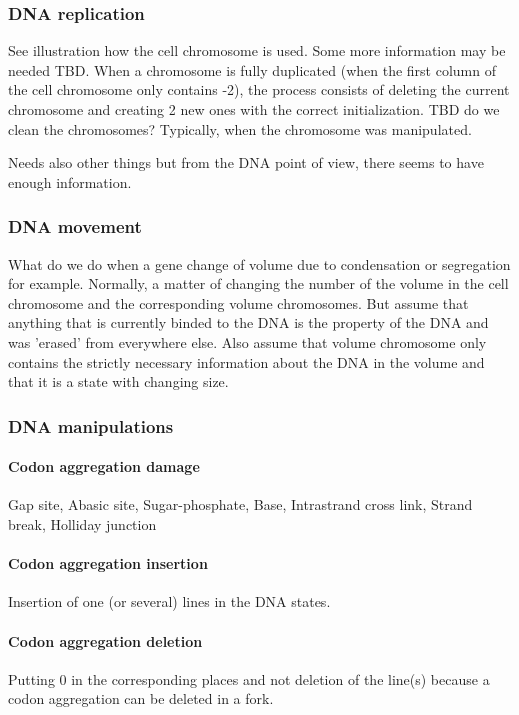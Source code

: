 \subsubsection{DNA replication}
See illustration how the cell chromosome is used. Some more information may be needed TBD.
When a chromosome is fully duplicated (when the first column of the cell chromosome only contains -2), the process consists of deleting the current chromosome and creating 2 new ones with the correct initialization. TBD do we clean the chromosomes? Typically, when the chromosome was manipulated.

Needs also other things but from the DNA point of view, there seems to have enough information.

\subsubsection{DNA movement}
\textcolor[rgb]{1.00,0.00,0.00}{What do we do when a gene change of volume due to condensation or segregation for example. Normally, a matter of changing the number of the volume in the cell chromosome and the corresponding volume chromosomes. But assume that anything that is currently binded to the DNA is the property of the DNA and was 'erased' from everywhere else. Also assume that volume chromosome only contains the strictly necessary information about the DNA in the volume and that it is a state with changing size.}

\subsubsection{DNA manipulations}
\paragraph{Codon aggregation damage}
\textcolor[rgb]{1.00,0.00,0.00}{Gap site, Abasic site, Sugar-phosphate, Base, Intrastrand cross link, Strand break, Holliday junction}

\paragraph{Codon aggregation insertion}
Insertion of one (or several) lines in the DNA states.

\paragraph{Codon aggregation deletion}
Putting 0 in the corresponding places and not deletion of the line(s) because a codon aggregation can be deleted in a fork.

